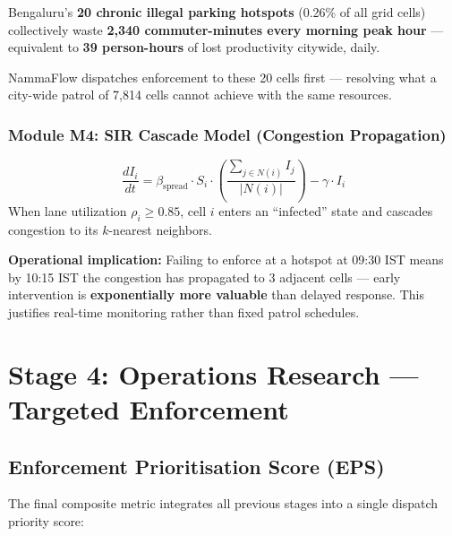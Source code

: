 \documentclass[12pt,a4paper]{article}
\begin{document}
\begin{tcolorbox}[resultbox, title={Headline Impact Metric}]
Bengaluru's \textbf{20 chronic illegal parking hotspots} (0.26\% of all grid cells) collectively waste \textbf{2,340 commuter-minutes every morning peak hour} — equivalent to \textbf{39 person-hours} of lost productivity citywide, daily.

NammaFlow dispatches enforcement to these 20 cells first — resolving what a city-wide patrol of 7,814 cells cannot achieve with the same resources.
\end{tcolorbox}

\subsubsection{Module M4: SIR Cascade Model (Congestion Propagation)}

\begin{tcolorbox}[formulabox]
\begin{equation}
    \frac{dI_i}{dt} = \beta_\text{spread} \cdot S_i \cdot \left(\frac{\sum_{j \in N(i)} I_j}{|N(i)|}\right) - \gamma \cdot I_i
    \label{eq:sir}
\end{equation}
When lane utilization $\rho_i \geq 0.85$, cell $i$ enters an ``infected'' state and cascades congestion to its $k$-nearest neighbors.
\end{tcolorbox}

\textbf{Operational implication:} Failing to enforce at a hotspot at 09:30 IST means by 10:15 IST the congestion has propagated to 3 adjacent cells — early intervention is \textbf{exponentially more valuable} than delayed response. This justifies real-time monitoring rather than fixed patrol schedules.

\section{Stage 4: Operations Research — Targeted Enforcement}

\subsection{Enforcement Prioritisation Score (EPS)}

The final composite metric integrates all previous stages into a single dispatch priority score:
\end{document}
